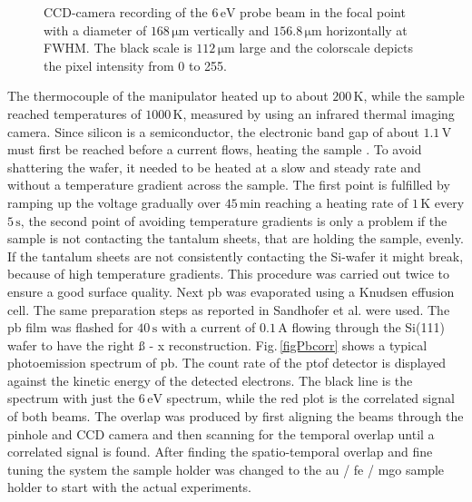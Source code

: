 \documentclass[a4paper,12pt,twoside]{article}
\begin{document}
\begin{figure}[H]
\begin{minipage}[t]{.5\linewidth}
			\caption{CCD-camera recording of the $6\,\mathrm{eV}$ probe beam in the focal point with a diameter of $168\,\mathrm{\mu m}$ vertically and $156.8\,\mathrm{\mu m}$ horizontally at FWHM. The black scale is $112\,\mathrm{\mu m}$ large and the colorscale depicts the pixel intensity from 0 to 255.}
			    \label{figfrog200}
		\end{minipage}
	\end{figure}
\noindent
The thermocouple of the manipulator heated up to about $200\,\mathrm{K}$, while the sample reached temperatures of $1000\,\mathrm{K}$, measured by using an infrared thermal imaging camera. Since silicon is a semiconductor, the electronic band gap of about $1.1\,\mathrm{V}$ must first be reached before a current flows, heating the sample \cite{benstreetman1999}. To avoid shattering the wafer, it needed to be heated at a slow and steady rate and without a temperature gradient across the sample. The first point is fulfilled by ramping up the voltage gradually over $45\,\mathrm{min}$ reaching a heating rate of $1\,\mathrm{K}$ every $5\,\mathrm{s}$, the second point of avoiding temperature gradients is only a problem if the sample is not contacting the tantalum sheets, that are holding the sample, evenly. If the tantalum sheets are not consistently contacting the Si-wafer it might break, because of high temperature gradients. This procedure was carried out twice to ensure a good surface quality. 
Next \gls{pb} was evaporated using a Knudsen effusion cell. The same preparation steps as reported in Sandhofer et al.\cite{Sandhofer2014} were used. The \gls{pb} film was flashed for $40\,\mathrm{s}$ with a current of $0.1\,\mathrm{A}$ flowing through the Si(111) wafer to have the right ß -  x  reconstruction.
Fig.\,\ref{figPbcorr} shows a typical photoemission spectrum of \gls{pb}. The count rate of the \gls{ptof} detector is displayed against the kinetic energy of the detected electrons. The black line is the spectrum with just the $6\,\mathrm{eV}$ spectrum, while the red plot is the correlated signal of both beams. The overlap was produced by first aligning the beams through the pinhole and CCD camera and then scanning for the temporal overlap until a correlated signal is found. After finding the spatio-temporal overlap and fine tuning the system the sample holder was changed to the \gls{au} / \gls{fe} / \gls{mgo} sample holder to start with the actual experiments.
\end{document}
